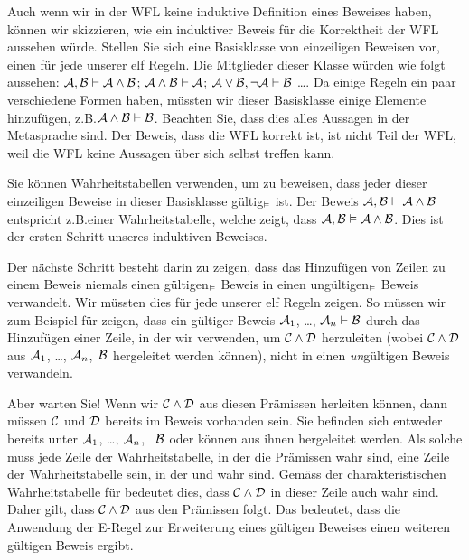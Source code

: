 Auch wenn wir in der WFL keine induktive Definition eines Beweises haben, können wir skizzieren, wie ein induktiver Beweis für die Korrektheit der WFL aussehen würde. Stellen Sie sich eine Basisklasse von einzeiligen Beweisen vor, einen für jede unserer elf Regeln. Die Mitglieder dieser Klasse würden wie folgt aussehen: $\mathcal{A}, \mathcal{B} \vdash  \mathcal{A} \wedge \mathcal{B}$; $\mathcal{A} \wedge \mathcal{B} \vdash \mathcal{A}$; $\mathcal{A} \vee \mathcal{B}, \neg\mathcal{A} \vdash  \mathcal{B}$ \ldots{}. Da einige Regeln ein paar verschiedene Formen haben, müssten wir dieser Basisklasse einige Elemente hinzufügen, z.B.\@ $\mathcal{A} \wedge \mathcal{B} \vdash  \mathcal{B}$. Beachten Sie, dass dies alles Aussagen in der Metasprache sind. Der Beweis, dass die WFL korrekt ist, ist nicht Teil der WFL, weil die WFL keine Aussagen über sich selbst treffen kann. 

Sie können Wahrheitstabellen verwenden, um zu beweisen, dass jeder dieser einzeiligen Beweise in dieser Basisklasse gültig$_{\vDash}$ ist. Der Beweis $\mathcal{A}, \mathcal{B} \vdash \mathcal{A} \wedge \mathcal{B}$ entspricht z.B.\@ einer Wahrheitstabelle, welche zeigt, dass $\mathcal{A}, \mathcal{B} \vDash  \mathcal{A} \wedge \mathcal{B}$. Dies ist der ersten Schritt unseres induktiven Beweises. 

Der nächste Schritt besteht darin zu zeigen, dass das Hinzufügen von Zeilen zu einem Beweis niemals einen gültigen$_{\vDash}$ Beweis in einen ungültigen$_{\vDash}$ Beweis verwandelt. Wir müssten dies für jede unserer elf Regeln zeigen. So müssen wir zum Beispiel für  zeigen, dass ein gültiger Beweis $\mathcal{A}_{1}$, \dots, $\mathcal{A}_{n} \vdash  \mathcal{B}$ durch das Hinzufügen einer Zeile, in der wir  verwenden, um $\mathcal{C} \wedge \mathcal{D}$ herzuleiten (wobei $\mathcal{C} \wedge \mathcal{D}$ aus $\mathcal{A}_{1}$, \dots, $\mathcal{A}_{n}$,~$\mathcal{B}$ hergeleitet werden können), nicht in einen \emph{un}gültigen Beweis verwandeln.

Aber warten Sie! Wenn wir $\mathcal{C} \wedge \mathcal{D}$ aus diesen Prämissen herleiten können, dann müssen $\mathcal{C}$ und $\mathcal{D}$ bereits im Beweis vorhanden sein. Sie befinden sich entweder bereits unter $\mathcal{A}_{1}$, \dots, $\mathcal{A}_{n}$, ~$\mathcal{B}$ oder können aus ihnen hergeleitet werden. Als solche muss jede Zeile der Wahrheitstabelle, in der die Prämissen wahr sind, eine Zeile der Wahrheitstabelle sein, in der  und  wahr sind. Gemäss der charakteristischen Wahrheitstabelle für \eand bedeutet dies, dass $\mathcal{C} \wedge \mathcal{D}$ in dieser Zeile auch wahr sind. Daher gilt, dass $\mathcal{C} \wedge \mathcal{D}$ aus den Prämissen folgt. Das bedeutet, dass die Anwendung der {\eand}E-Regel zur Erweiterung eines gültigen Beweises einen weiteren gültigen Beweis ergibt.

